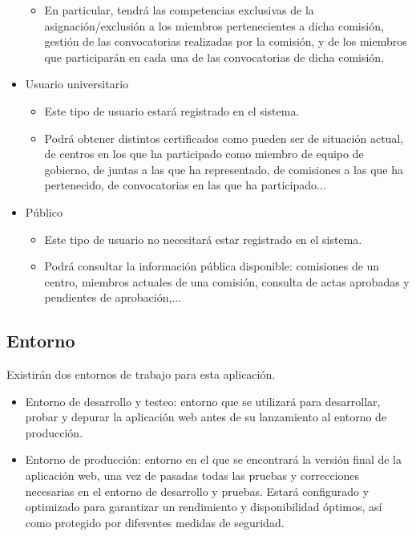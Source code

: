 \begin{itemize}
\begin{itemize}
               \item En particular, tendrá las competencias exclusivas de la asignación/exclusión a los miembros pertenecientes a dicha comisión, gestión de las convocatorias realizadas por la comisión, y de los miembros que participarán en cada una de las convocatorias de dicha comisión.
            \end{itemize}
        \item Usuario universitario
            \begin{itemize}
                \item Este tipo de usuario estará registrado en el sistema.
                \item Podrá obtener distintos certificados como pueden ser de situación actual, de centros en los que ha participado como miembro de equipo de gobierno, de juntas a las que ha representado, de comisiones a las que ha pertenecido, de convocatorias en las que ha participado...
              \end{itemize}
        \item Público
        \begin{itemize}
              \item Este tipo de usuario no necesitará estar registrado en el sistema.
              \item Podrá consultar la información pública disponible: comisiones de un centro, miembros actuales de una comisión, consulta de actas aprobadas y pendientes de aprobación,...
          \end{itemize}
     \end{itemize}
     
\subsection{Entorno}
 Existirán dos entornos de trabajo para esta aplicación. 

  \begin{itemize}
     \item Entorno de desarrollo y testeo: entorno que se utilizará para desarrollar, probar y depurar la aplicación web antes de su lanzamiento al entorno de producción.
     \item Entorno de producción:
         entorno en el que se encontrará la versión final de la aplicación web, una vez de pasadas todas las pruebas y correcciones necesarias en el entorno de desarrollo y pruebas. Estará configurado y optimizado para garantizar un rendimiento y disponibilidad óptimos, así como protegido por diferentes medidas de seguridad.
 \end{itemize}

